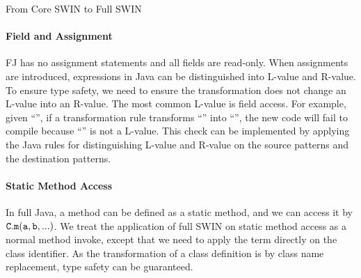 \begin{section}{From Core SWIN to Full SWIN%
  }
\paragraph{Field and Assignment} 
FJ has no assignment statements and all fields are read-only. When assignments are introduced, expressions in Java can be
distinguished into L-value and R-value. To ensure type safety, we need
to ensure the transformation does not change an L-value into an
R-value. The most common L-value is field access. For example, given ``'', if a transformation rule
transforms ``'' into ``'', the new code will fail to
compile because ``'' is not a L-value. This check can be
implemented by applying the Java rules for distinguishing L-value and
R-value on the source patterns and the destination patterns.


\paragraph{Static Method Access} In full Java, a method can be defined
as a static method, and we can access it by $\tt C.m(a,b,...)$. 
We treat the application of full SWIN on static method access as a normal method invoke, except that we 
need to apply the term directly on the class identifier. As the transformation of a class definition is 
by class name replacement, type safety can be guaranteed.


\end{section}
